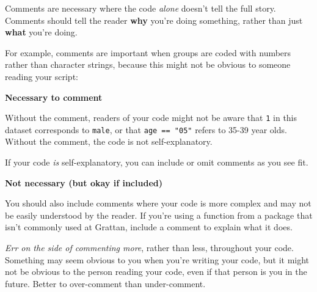 \documentclass[]{book}
\newenvironment{Shaded}{\begin{snugshade}}{\end{snugshade}}
\newcommand{\CommentTok}[1]{\textcolor[rgb]{0.56,0.35,0.01}{\textit{#1}}}
\newcommand{\DecValTok}[1]{\textcolor[rgb]{0.00,0.00,0.81}{#1}}
\newcommand{\KeywordTok}[1]{\textcolor[rgb]{0.13,0.29,0.53}{\textbf{#1}}}
\newcommand{\NormalTok}[1]{#1}
\newcommand{\OperatorTok}[1]{\textcolor[rgb]{0.81,0.36,0.00}{\textbf{#1}}}
\newcommand{\StringTok}[1]{\textcolor[rgb]{0.31,0.60,0.02}{#1}}
\begin{document}
Comments are necessary where the code \emph{alone} doesn't tell the full story. Comments should tell the reader \textbf{why} you're doing something, rather than just \textbf{what} you're doing.

For example, comments are important when groups are coded with numbers rather than character strings, because this might not be obvious to someone reading your script:

\textbf{Necessary to comment}

\begin{Shaded}
\end{Shaded}

Without the comment, readers of your code might not be aware that \texttt{1} in this dataset corresponds to \texttt{male}, or that \texttt{age\ ==\ "05"} refers to 35-39 year olds. Without the comment, the code is not self-explanatory.

If your code \emph{is} self-explanatory, you can include or omit comments as you see fit.

\textbf{Not necessary (but okay if included)}

\begin{Shaded}
\end{Shaded}

You should also include comments where your code is more complex and may not be easily understood by the reader. If you're using a function from a package that isn't commonly used at Grattan, include a comment to explain what it does.

\emph{Err on the side of commenting more}, rather than less, throughout your code. Something may seem obvious to you when you're writing your code, but it might not be obvious to the person reading your code, even if that person is you in the future. Better to over-comment than under-comment.
\end{document}
